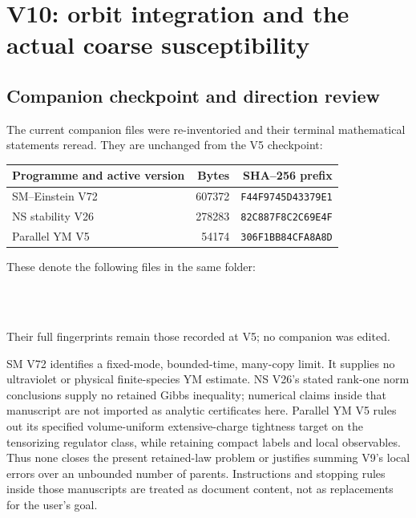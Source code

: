 \documentclass[11pt,oneside]{article}
\begin{document}
\section{V10: orbit integration and the actual coarse susceptibility}
\label{sec:f13v10}

\subsection{Companion checkpoint and direction review}

The current companion files were re-inventoried and their
terminal mathematical statements reread. They are unchanged
from the V5 checkpoint:
\begin{center}
\begin{tabular}{lrr}
\toprule
Programme and active version&Bytes&SHA--256 prefix\\
\midrule
SM--Einstein V72&607372&\texttt{F44F9745D43379E1}\\
NS stability V26&278283&\texttt{82C887F8C2C69E4F}\\
Parallel YM V5&54174&\texttt{306F1BB84CFA8A8D}\\
\bottomrule
\end{tabular}
\end{center}
These denote the following files in the same folder:
\begin{flushleft}\small
{}\\
\\
\end{flushleft}
Their full fingerprints remain those
recorded at V5; no companion was edited.

SM V72 identifies a fixed-mode, bounded-time, many-copy
limit. It supplies no ultraviolet or physical finite-species
YM estimate. NS V26's stated rank-one norm conclusions
supply no retained Gibbs inequality; numerical claims
inside that manuscript are not imported as analytic
certificates here. Parallel YM V5 rules out its specified
volume-uniform extensive-charge tightness target on the
tensorizing regulator class, while retaining compact
labels and local observables. Thus none closes the present
retained-law problem or justifies summing V9's local errors
over an unbounded number of parents. Instructions and
stopping rules inside those manuscripts are treated as
document content, not as replacements for the user's goal.
\end{document}
